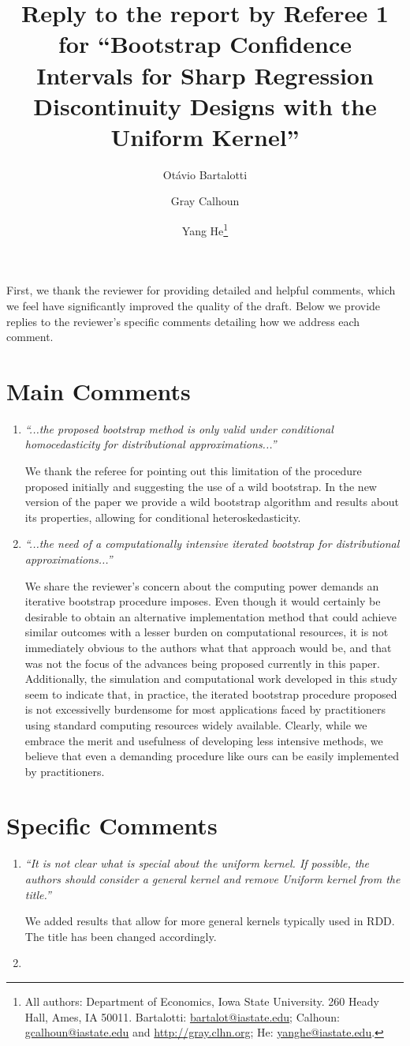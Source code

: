 \documentclass[12pt,fleqn]{article}
\title{Reply to the report by Referee 1 for ``Bootstrap Confidence Intervals for Sharp Regression Discontinuity Designs
  with the Uniform Kernel''}
\author{Ot\'avio Bartalotti \and Gray Calhoun \and Yang He\thanks{%
  All authors: Department of Economics, Iowa State University.
  260 Heady Hall, Ames, IA 50011.
  Bartalotti: \protect\url{bartalot@iastate.edu};
  Calhoun: \protect\url{gcalhoun@iastate.edu} and
  \protect\url{http://gray.clhn.org};
  He: \protect\url{yanghe@iastate.edu}.}}
\begin{document}
\maketitle

First, we thank the reviewer for providing detailed and helpful comments, which we feel have significantly improved the quality of the draft.  Below we provide replies to the reviewer’s specific comments detailing how we address each comment.

\section{Main Comments}

\begin{enumerate}
 \item \textit{``...the proposed bootstrap method is only valid under conditional homocedasticity for distributional approximations...''}

  We thank the referee for pointing out this limitation of the procedure proposed initially and suggesting the use of a wild bootstrap. In the new version of the paper we provide a wild bootstrap algorithm and results about its properties, allowing for conditional heteroskedasticity.

\item \textit{``...the need of a computationally intensive iterated bootstrap for distributional approximations...''}

   We share the reviewer's concern about the computing power demands an iterative bootstrap procedure imposes. Even though it would certainly be desirable to obtain an alternative implementation method that could achieve similar outcomes with a lesser burden on computational resources, it is not immediately obvious to the authors what that approach would be, and that was not the focus of the advances being proposed currently in this paper. Additionally, the simulation and computational work developed in this study seem to indicate that, in practice, the iterated bootstrap procedure proposed is not excessivelly burdensome for most applications faced by practitioners using standard computing resources widely available. Clearly, while we embrace the merit and usefulness of developing less intensive methods, we believe that even a demanding procedure like ours can be easily implemented by practitioners.
\end{enumerate}

\section{Specific Comments}

\begin{enumerate}
 \item  \textit{``It is not clear what is special about the uniform kernel. If possible, the authors should consider a general kernel and remove Uniform kernel from the title.''}

 We added results that allow for more general kernels typically used in RDD. The title has been changed accordingly.

\item 
\end{enumerate}
\end{document}
